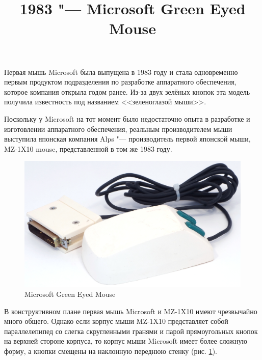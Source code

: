 \documentclass[11pt, a4paper]{article}
\begin{document}
\title{1983 "--- Microsoft Green Eyed Mouse}
\date{}
\maketitle
{}

Первая мышь Microsoft была выпущена в 1983 году и стала одновременно первым продуктом подразделения по разработке аппаратного обеспечения, которое компания открыла годом ранее. Из-за двух зелёных кнопок эта модель получила известность под названием <<зеленоглазой мыши>>.

Поскольку у Microsoft на тот момент было недостаточно опыта в разработке и изготовлении аппаратного обеспечения, реальным производителем мыши выступила японская компания Alps "--- производитель первой японской мыши, MZ-1X10 mouse, представленной в том же 1983 году.

\begin{figure}[h]
   \centering
    \includegraphics[scale=0.6]{1983_microsoft_green_eyed_mouse/pic_30.jpg}
    \caption{Microsoft Green Eyed Mouse}
    \label{fig:MicrosoftGreenEyedPic}
\end{figure}

В конструктивном плане первая мышь Microsoft и MZ-1X10 имеют чрезвычайно много общего. Однако если корпус мыши MZ-1X10 представляет собой параллелепипед со слегка скругленными гранями и парой прямоугольных кнопок на верхней стороне корпуса, то корпус мыши Microsoft имеет более сложную форму, а кнопки смещены на наклонную переднюю стенку (рис.  \ref{fig:MicrosoftGreenEyedPic}).
\end{document}
